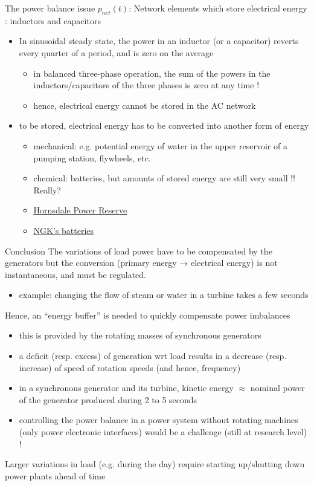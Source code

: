 \begin{frame}[allowframebreaks]{The power balance issue}
$p_{net}(t)$: Network elements which store electrical energy : inductors and capacitors
\begin{itemize}
\item In sinusoidal steady state, the power in an inductor (or a capacitor) reverts every quarter of a period, and is zero on the average
\begin{itemize}
\item in balanced three-phase operation, the sum of the powers in the inductors/capacitors of the three phases is zero at any time !
\item hence, electrical energy cannot be stored in the AC network
\end{itemize}
\item to be stored, electrical energy has to be converted into another form of energy
\begin{itemize}
\item mechanical: e.g. potential energy of water in the upper reservoir of a pumping station, flywheels, etc.
\item chemical: batteries, but amounts of stored energy are still very small !! Really?
\item \href{https://en.wikipedia.org/wiki/Hornsdale_Power_Reserve}{\underline{Hornsdale Power Reserve}}
\item \href{https://www.energy-storage.news/blogs/sponsored-ngks-nas-grid-scale-batteries-in-depth}{\underline{NGK's batteries}}
\end{itemize}
\end{itemize}
\end{frame}

\begin{frame}[allowframebreaks]{Conclusion}
The variations of load power have to be compensated by the generators but the conversion (primary energy → electrical energy) is not instantaneous, and must be regulated.
\begin{itemize}
\item example: changing the flow of steam or water in a turbine takes a few seconds
\end{itemize}
Hence, an “energy buffer” is needed to quickly compensate power imbalances
\begin{itemize}
\item this is provided by the rotating masses of synchronous generators
\item a deficit (resp. excess) of generation wrt load results in a decrease (resp. increase) of speed of rotation speeds (and hence, frequency)
\item in a synchronous generator and its turbine, kinetic energy $\approx$ nominal power of the generator produced during 2 to 5 seconds
\item controlling the power balance in a power system without rotating machines (only power electronic interfaces) would be a challenge (still at research level) !
\end{itemize}
Larger variations in load (e.g. during the day) require starting up/shutting down power plants ahead of time
\end{frame}

